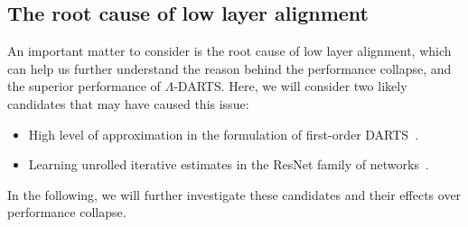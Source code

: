 \documentclass{article} \usepackage{fancyhdr, iclr2023_conference, times}
\newcommand{\mydarts}{$\Lambda$-DARTS\xspace}
\newcommand{\lambdafn}{layer alignment\xspace}
\begin{document}
\subsection{The root cause of low \lambdafn}
\label{appndx:cause-of-lambdafn}
\par An important matter to consider is the root cause of low \lambdafn, which can help us further understand the reason behind the performance collapse, and the superior performance of \mydarts. Here, we will consider two likely candidates that may have caused this issue:
\begin{itemize}
    \item High level of approximation in the formulation of first-order DARTS~\citep{DBLP:conf/icml/ZhangSPCAH21}.
    \item Learning unrolled iterative estimates in the ResNet family of networks~\citep{DBLP:conf/iclr/GreffSS17}.
\end{itemize}
In the following, we will further investigate these candidates and their effects over performance collapse.
\end{document}
